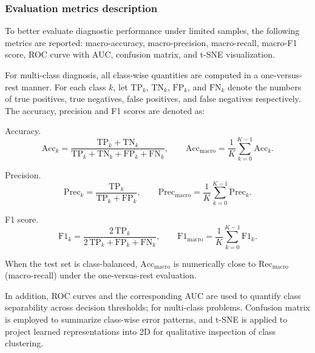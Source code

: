 \documentclass[a4paper]{cas-sc}
\begin{document}

\subsubsection{Evaluation metrics description}
To better evaluate diagnostic performance under limited samples, the following metrics are reported: macro-accuracy, macro-precision, macro-recall, macro-F1 score, ROC curve with AUC, confusion matrix, and t-SNE visualization. 

For multi-class diagnosis, all class-wise quantities are computed in a one-versus-rest manner. 
For each class $k$, let $\mathrm{TP}_k$, $\mathrm{TN}_k$, $\mathrm{FP}_k$, and $\mathrm{FN}_k$ denote the numbers of true positives, true negatives, false positives, and false negatives respectively. The accuracy, precision and F1 scores are denoted as:

Accuracy.
\begin{equation}
\mathrm{Acc}_k=\frac{\mathrm{TP}_k+\mathrm{TN}_k}{\mathrm{TP}_k+\mathrm{TN}_k+\mathrm{FP}_k+\mathrm{FN}_k},\qquad
\mathrm{Acc}_{\mathrm{macro}}=\frac{1}{K}\sum_{k=0}^{K-1}\mathrm{Acc}_k .
\label{eq:acc_macro}
\end{equation}

Precision.
\begin{equation}
\mathrm{Prec}_k=\frac{\mathrm{TP}_k}{\mathrm{TP}_k+\mathrm{FP}_k},\qquad
\mathrm{Prec}_{\mathrm{macro}}=\frac{1}{K}\sum_{k=0}^{K-1}\mathrm{Prec}_k .
\label{eq:prec_macro}
\end{equation}

F1 score.
\begin{equation}
\mathrm{F1}_k=\frac{2\,\mathrm{TP}_k}{2\,\mathrm{TP}_k+\mathrm{FP}_k+\mathrm{FN}_k},\qquad
\mathrm{F1}_{\mathrm{macro}}=\frac{1}{K}\sum_{k=0}^{K-1}\mathrm{F1}_k .
\label{eq:f1_macro}
\end{equation}

When the test set is class-balanced, $\mathrm{Acc}_{\mathrm{macro}}$ is numerically close to $\mathrm{Rec}_{\mathrm{macro}}$ (macro-recall) under the one-versus-rest evaluation.

In addition, ROC curves and the corresponding AUC are used to quantify class separability across decision thresholds; for multi-class problems. Confusion matrix is employed to summarize class-wise error patterns, and t-SNE is applied to project learned representations into 2D for qualitative inspection of class clustering.
\end{document}

